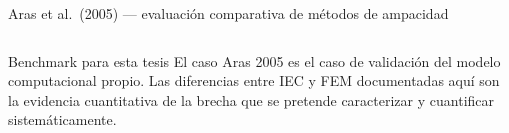 \documentclass[aspectratio=169]{beamer}
\newcommand{\refcite}[1]{{\footnotesize\color{gray!70!black} #1}}
\begin{document}
\begin{frame}{Aras et al.\ (2005) --- evaluación comparativa de métodos de ampacidad}
\begin{columns}[T]

\vspace{0.3em}
\begin{alertblock}{\scriptsize Benchmark para esta tesis}\scriptsize
El caso Aras 2005 es el caso de validación del modelo computacional propio.
Las diferencias entre IEC y FEM documentadas aquí son la evidencia cuantitativa
de la brecha que se pretende caracterizar y cuantificar sistemáticamente.
\end{alertblock}
\end{columns}
\end{frame}
\end{document}
